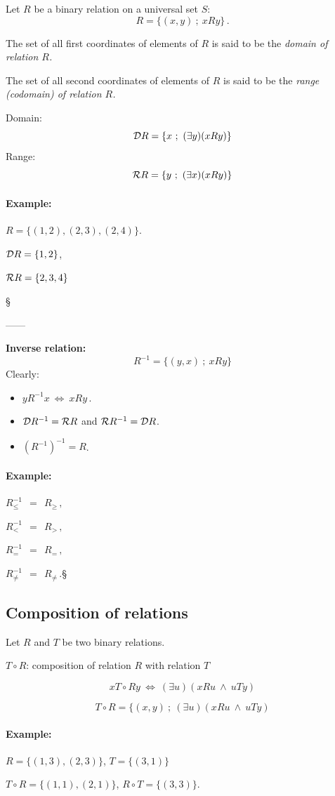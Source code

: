 \documentclass[11pt,paper=b5,footinclude,headinclude]{scrbook} %
\def\inn {{~\wedge~}}
\def\cee {{~\Leftrightarrow~}}
\def\zgled{\paragraph{Example:}}
\def\kz{{\hfill{\S}}}%
\theoremstyle{remark}
\theoremstyle{definition} %
\theoremstyle{theorem} %
\begin{document}
Let $R$ be a binary relation on a universal set $S$:
$$R = \{(x,y)~;~xRy\}\,.$$

The set of all first coordinates of elements of $R$ is said to be the {\em domain of relation $R$.}

The set of all second coordinates of elements of $R$ is said to be the {\em range (codomain) of relation $R$.}

Domain: $${\cal D}R = \{x~;~(\exists y)(xRy)\}$$
Range: $${\cal R}R = \{y~;~(\exists x)(xRy)\}$$

\medskip

\zgled

$R = \{(1,2), (2,3), (2,4)\}$.

${\cal D}R = \{1,2\}$,

${\cal R}R = \{2,3,4\}$

\kz

\bigskip

------

\textbf{ Inverse relation:}
$$R^{-1}= \{(y,x)~;~xRy\}$$
Clearly:
\begin{itemize}
  \item $yR^{-1}x \cee xRy\,.$
  \item ${\cal D}R^{-1} = {\cal R}R$ and ${\cal R}R^{-1} = {\cal D}R$.
    \item $(R^{-1})^{-1} = R$.
\end{itemize}


\bigskip
\zgled

 $R_\le^{-1}~~=~~R_\ge\,,$

 $R_<^{-1}~~=~~R_>\,,$

 $R_=^{-1}~~=~~R_=\,,$

$R_{\neq}^{-1}~~=~~R_{\neq}\,.$\kz

\subsection{Composition of relations}

Let $R$ and $T$ be two binary relations.

$T\circ R$: composition of relation $R$ with relation $T$

$$x T\circ R y \cee (\exists u)(xRu\inn uTy)$$

$$T\circ R = \{(x,y)~;~(\exists u)(xRu\inn uTy)$$


\bigskip
\zgled

$R = \{(1,3),(2,3)\}$, $T = \{(3,1)\}$

$T\circ R = \{(1,1), (2,1)\}$, $R\circ T = \{(3,3)\}$.
\end{document}
